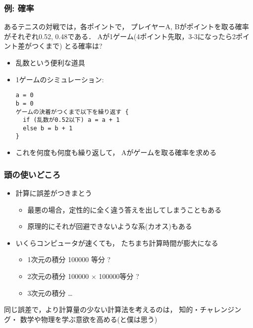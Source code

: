 \documentclass[12pt,dvipdfmx]{beamer}
\newcommand{\aka}[1]{{\color{red}#1}}
\begin{document}
\begin{frame}[fragile]
\frametitle{例: 確率}
あるテニスの対戦では，各ポイントで，
プレイヤーA, Bがポイントを取る確率がそれぞれ0.52, 0.48である．
Aが1ゲーム(4ポイント先取，3-3になったら2ポイント差がつくまで)
とる確率は? 

\begin{itemize}
\item 乱数という便利な道具
\item 1ゲームのシミュレーション:
\begin{lstlisting}
a = 0
b = 0
ゲームの決着がつくまで以下を繰り返す {
  if (乱数が0.52以下) a = a + 1
  else b = b + 1
}
\end{lstlisting}
\item これを何度も何度も繰り返して，
Aがゲームを取る確率を求める
\end{itemize}
\end{frame}

\begin{frame}
\frametitle{頭の使いどころ}

\begin{itemize}
\item 計算に誤差がつきまとう
  \begin{itemize}
  \item 最悪の場合，定性的に全く違う答えを出してしまうこともある
  \item 原理的にそれが回避できないような系(カオス)もある
  \end{itemize}
\item いくらコンピュータが速くても，
  たちまち計算時間が膨大になる
  \begin{itemize}
  \item 1次元の積分 100000 等分 ?
  \item 2次元の積分 100000 $\times$ 100000等分 ?
  \item 3次元の積分 \ldots 
  \end{itemize}
\end{itemize}

同じ誤差で，より計算量の少ない計算法を考えるのは，
知的・チャレンジング・
\aka{数学や物理を学ぶ意欲を高める{\tiny (と僕は思う)}}

\end{frame}
\end{document}
